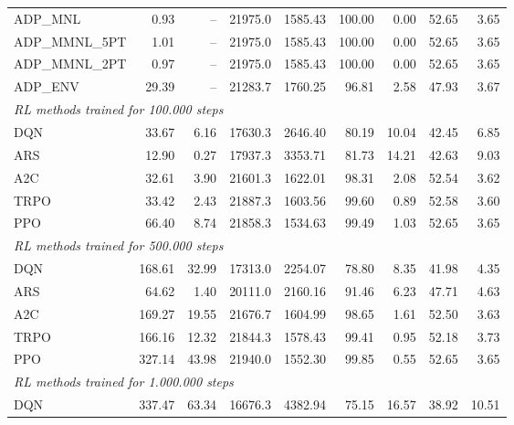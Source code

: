 \begin{samepage}
\begin{center}
\begin{tabular}{l|rr|rr|rr|rr}
    \midrule
    ADP\_MNL     &     0.93 &    -- &    21975.0 &    1585.43 &  100.00 &    0.00 &   52.65 &    3.65 \\
    ADP\_MMNL\_5PT &     1.01 &    -- &    21975.0 &    1585.43 &  100.00 &    0.00 &   52.65 &    3.65 \\
    ADP\_MMNL\_2PT &     0.97 &    -- &    21975.0 &    1585.43 &  100.00 &    0.00 &   52.65 &    3.65 \\
    ADP\_ENV     &    29.39 &    -- &    21283.7 &    1760.25 &   96.81 &    2.58 &   47.93 &    3.67 \\
    \midrule
    \multicolumn{9}{l}{\textit{RL methods trained for 100.000 steps}} \\
    \midrule
    DQN          &    33.67 &     6.16 &    17630.3 &    2646.40 &   80.19 &   10.04 &   42.45 &    6.85 \\
    ARS          &    12.90 &     0.27 &    17937.3 &    3353.71 &   81.73 &   14.21 &   42.63 &    9.03 \\
    A2C          &    32.61 &     3.90 &    21601.3 &    1622.01 &   98.31 &    2.08 &   52.54 &    3.62 \\
    TRPO         &    33.42 &     2.43 &    21887.3 &    1603.56 &   99.60 &    0.89 &   52.58 &    3.60 \\
    PPO          &    66.40 &     8.74 &    21858.3 &    1534.63 &   99.49 &    1.03 &   52.65 &    3.65 \\
    \midrule
    \multicolumn{9}{l}{\textit{RL methods trained for 500.000 steps}} \\
    \midrule
    DQN          &   168.61 &    32.99 &    17313.0 &    2254.07 &   78.80 &    8.35 &   41.98 &    4.35 \\
    ARS          &    64.62 &     1.40 &    20111.0 &    2160.16 &   91.46 &    6.23 &   47.71 &    4.63 \\
    A2C          &   169.27 &    19.55 &    21676.7 &    1604.99 &   98.65 &    1.61 &   52.50 &    3.63 \\
    TRPO         &   166.16 &    12.32 &    21844.3 &    1578.43 &   99.41 &    0.95 &   52.18 &    3.73 \\
    PPO          &   327.14 &    43.98 &    21940.0 &    1552.30 &   99.85 &    0.55 &   52.65 &    3.65 \\
    \midrule
    \multicolumn{9}{l}{\textit{RL methods trained for 1.000.000 steps}} \\
    \midrule
    DQN          &   337.47 &    63.34 &    16676.3 &    4382.94 &   75.15 &   16.57 &   38.92 &   10.51 \\

\end{tabular}
\end{center}
\end{samepage}
